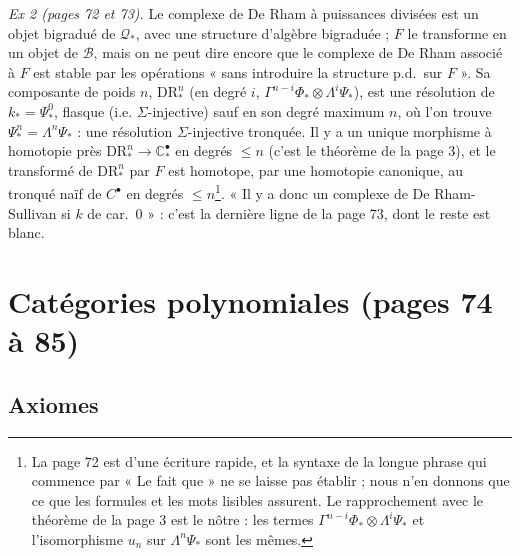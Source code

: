 \documentclass[11pt,a4paper]{article}
\begin{document}
\emph{Ex 2 (pages 72 et 73).} Le complexe de De Rham à puissances divisées
est un objet bigradué de $\mathcal{Q}_{*}$, avec une structure d'algèbre
bigraduée ; $F$ le transforme en un objet de $\mathcal{B}$, mais on ne peut
dire encore que le complexe de De Rham associé à $F$ est stable par les
opérations « sans introduire la structure p.d.\ sur $F$ ». Sa composante de
poids $n$, $\mathrm{DR}^{n}_{*}$ (en degré $i$, $\Gamma^{n-i}\Phi_{*} \otimes
\Lambda^{i}\Psi_{*}$), est une résolution de $k_{*} = \Psi^{0}_{*}$, flasque
(i.e. $\Sigma$-injective) sauf en son degré maximum $n$, où l'on trouve
$\Psi^{n}_{*} = \Lambda^{n}\Psi_{*}$ : une résolution $\Sigma$-injective
tronquée. Il y a un unique morphisme à homotopie près $\mathrm{DR}^{n}_{*}
\to \mathbb{C}^{\bullet}_{*}$ en degrés $\leqslant n$ (c'est le théorème de
la page 3), et le transformé de $\mathrm{DR}^{n}_{*}$ par $F$ est homotope,
par une homotopie canonique, au tronqué naïf de $C^{\bullet}$ en degrés
$\leqslant n$\footnote{La page 72 est d'une écriture rapide, et la syntaxe de
la longue phrase qui commence par « Le fait que » ne se laisse pas établir ;
nous n'en donnons que ce que les formules et les mots lisibles assurent.
Le rapprochement avec le théorème de la page 3 est le nôtre : les termes
$\Gamma^{n-i}\Phi_{*} \otimes \Lambda^{i}\Psi_{*}$ et l'isomorphisme $u_{n}$
sur $\Lambda^{n}\Psi_{*}$ sont les mêmes.}. « Il y a donc un complexe de De
Rham-Sullivan si $k$ de car.\ $0$ » : c'est la dernière ligne de la page 73,
dont le reste est blanc.

\section*{Catégories polynomiales (pages 74 à 85)}

\subsection*{Axiomes}
\end{document}
